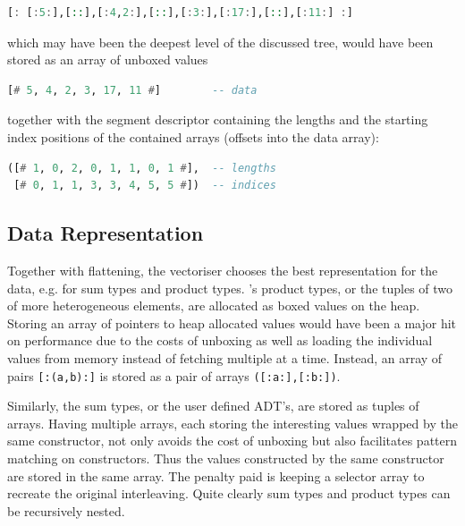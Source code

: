 \documentclass[preamble.tex]{subfiles}
\begin{document}
\begin{lstlisting}[basicstyle={\ttfamily},language=Haskell]
[: [:5:],[::],[:4,2:],[::],[:3:],[:17:],[::],[:11:] :]
\end{lstlisting}


which may have been the deepest level of the discussed tree, would have been stored as an array of unboxed values

\begin{lstlisting}[basicstyle={\ttfamily},language=Haskell]
[# 5, 4, 2, 3, 17, 11 #]        -- data
\end{lstlisting}


together with the segment descriptor containing the lengths and the starting index positions of the contained arrays (offsets into the data array):

\begin{lstlisting}[basicstyle={\ttfamily},language=Haskell]
([# 1, 0, 2, 0, 1, 1, 0, 1 #],  -- lengths
 [# 0, 1, 1, 3, 3, 4, 5, 5 #])  -- indices
\end{lstlisting}



\subsection{\label{sub:DPH-Data-Repr}Data Representation}

Together with flattening, the vectoriser chooses the best representation for the data, e.g. for sum types and product types. \Haskell's product types, or the tuples of two of more heterogeneous elements, are allocated as boxed values on the heap. Storing an array of pointers to heap allocated values would have been a major hit on performance due to the costs of unboxing as well as loading the individual values from memory instead of fetching multiple at a time. Instead, an array of pairs \texttt{{[}:(a,b):{]}} is stored as a pair of arrays \texttt{({[}:a:{]},{[}:b:{]})}.

Similarly, the sum types, or the user defined ADT's, are stored as tuples of arrays. Having multiple arrays, each storing the interesting values wrapped by the same constructor, not only avoids the cost of unboxing but also facilitates pattern matching on constructors. Thus the values constructed by the same constructor are stored in the same array. The penalty paid is keeping a selector array to recreate the original interleaving. Quite clearly sum types and product types can be recursively nested.%

\end{document}
